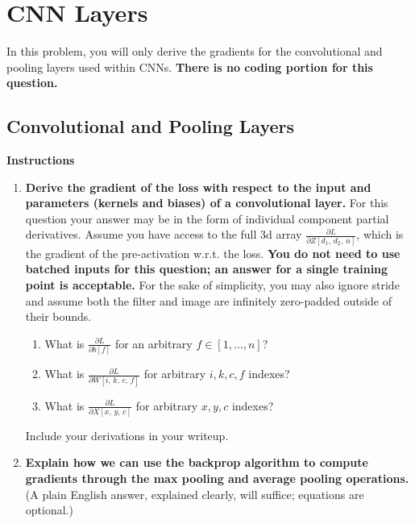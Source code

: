 \documentclass{article}
\newcommand{\Question}[1]{\Large \section{ #1 } \normalsize}
\begin{document}
\newpage
\Question{CNN Layers}
In this problem, you will only derive the gradients for the convolutional and pooling layers used within CNNs. 
\textbf{There is no coding portion for this question.}

\subsection{Convolutional and Pooling Layers}
\textbf{Instructions}
\begin{enumerate}
    \item 
    \textbf{Derive the gradient of the loss with respect to the input and parameters (kernels and biases) of a convolutional layer.} 
    For this question your answer may be in the form of individual component partial derivatives. 
    Assume you have access to the full 3d array $\frac{\partial L}{\partial Z[d_1,\, d_2,\, n]}$, which is the gradient of the pre-activation w.r.t. the loss. 
    \textbf{You do not need to use batched inputs for this question; an answer for a single training point is acceptable.} 
    For the sake of simplicity, you may also ignore stride and assume both the filter and image are infinitely zero-padded outside of their bounds.
    \begin{enumerate}
        \item 
        What is $\frac{\partial L}{\partial b[f]}$ for an arbitrary $f \in [1, \dots, n]$?
        \item 
        What is $\frac{\partial L}{\partial W[i,\, k,\, c,\, f]}$ for arbitrary $i, k, c, f$ indexes? 
        \item 
        What is $\frac{\partial L}{\partial X[x,\, y,\, c]}$ for arbitrary $x, y, c$ indexes? 
    \end{enumerate}
    Include your derivations in your writeup.
    
    \item 
    \textbf{Explain how we can use the backprop algorithm to compute gradients through the max pooling and average pooling operations.} 
    (A plain English answer, explained clearly, will suffice; equations are optional.) 
\end{enumerate}
\end{document}
